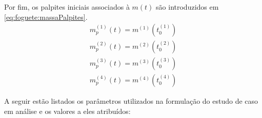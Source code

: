 Por fim, os palpites iniciais associados à $ m(t) $ são introduzidos em \eqref{eq:foguete:massaPalpites}.
%
\begin{equation}
	\label{eq:foguete:massaPalpites}
	\begin{gathered}
		m_p^{(1)}(t) = m^{(1)} \left( t_0^{(1)} \right) \\
		m_p^{(2)}(t) = m^{(2)} \left( t_0^{(2)} \right) \\
		m_p^{(3)}(t) = m^{(3)} \left( t_0^{(3)} \right) \\
		m_p^{(4)}(t) = m^{(4)} \left( t_0^{(4)} \right) 
	\end{gathered}
\end{equation}


A seguir estão listados os parâmetros utilizados na formulação do estudo de caso em análise e os valores a eles atribuídos:
%
